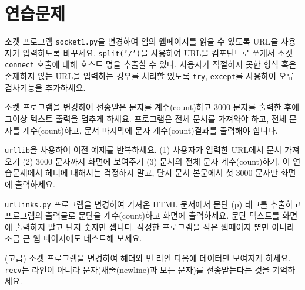 \section{연습문제}

\begin{ex}
소켓 프로그램 {\tt socket1.py}을 변경하여 임의 웹페이지를 읽을 수 있도록 URL을 사용자가 입력하도록 바꾸세요.
{\tt split('/')}을 사용하여 URL을 컴포턴트로 쪼개서 소켓 {\tt connect} 호출에 대해 호스트 명을 추출할 수 있다.
사용자가 적절하지 못한 형식 혹은 존재하지 않는 URL을 입력하는 경우를 처리할 있도록 {\tt try}, {\tt except}를 사용하여 오류 검사기능을 추가하세요.
\end{ex}

\begin{ex}
소켓 프로그램을 변경하여 전송받은 문자를 계수(count)하고 3000 문자를 출력한 후에 그이상 텍스트 출력을 멈추게 하세요.
프로그램은 전체 문서를 가져와야 하고, 전체 문자를 계수(count)하고, 문서 마지막에 문자 계수(count)결과를 출력해야 합니다.
\end{ex}

\begin{ex}
{\tt urllib}을 사용하여 이전 예제를 반복하세요. (1) 사용자가 입력한 URL에서 문서 가져오기
(2) 3000 문자까지 화면에 보여주기 (3) 문서의 전체 문자 계수(count)하기.
이 연습문제에서 헤더에 대해서는 걱정하지 말고, 단지 문서 본문에서 첫 3000 문자만 화면에 출력하세요.
\end{ex}

\begin{ex} {\tt urllinks.py} 프로그램을 변경하여 가져온 HTML 문서에서 문단 (p) 태그를 추출하고
프로그램의 출력물로 문단을 계수(count)하고 화면에 출력하세요. 
문단 텍스트를 화면에 출력하지 말고 단지 숫자만 셉니다.
작성한 프로그램을 작은 웹페이지 뿐만 아니라 조금 큰 웹 페이지에도 테스트해 보세요.
\end{ex}

\begin{ex}
(고급) 소켓 프로그램을 변경하여 헤더와 빈 라인 다음에 데이터만 보여지게 하세요.
{\tt recv}는 라인이 아니라 문자(새줄(newline)과 모든 문자)를 전송받는다는 것을 기억하세요.
\end{ex}


